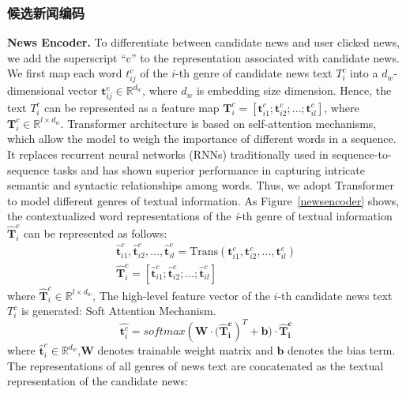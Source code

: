 \documentclass[withoutpreface,bwprint]{cumcmthesis} %
\begin{document}
	\subsubsection{ 候选新闻编码}
	\textbf{News Encoder.} 
	To differentiate between candidate news and user clicked news, we add the superscript “c” to the representation associated with candidate news.
	We first map each word $t^c_{ij}$ of the $i$-th genre of candidate news text $T_i^c$ into a $d_w$-dimensional vector $\mathbf{t}_{ij}^c \in \mathbb{R}^{d_w}$, where $d_w$ is embedding size dimension. Hence, the text $T_i^c$ can be represented as a feature map $\mathbf{T}_i^c = [\mathbf{t}_{i1}^c; \mathbf{t}_{i2}^c; \dots; \mathbf{t}_{il}^c]$, where $\mathbf{T}_i^c \in \mathbb{R}^{l \times d_w}$. 
	Transformer architecture is based on self-attention mechanisms, which allow the model to weigh the importance of different words in a sequence. It replaces recurrent neural networks (RNNs) traditionally used in sequence-to-sequence tasks and has shown superior performance in capturing intricate semantic and syntactic relationships among words. Thus, we adopt Transformer to model different genres of textual information. As Figure~\ref{newsencoder} shows, the contextualized word representations of the \textit{i}-th genre of textual information $\hat{\mathbf{T}}_i^c$ can be represented as follows:
	\begin{equation}\label{eta}
	\begin{split}
	\hat{\mathbf{t}} _{i1}^{c}, \hat{\mathbf{t}}_{i2}^{c}, \ldots, \hat{\mathbf{t}}_{il}^{c} =\mathrm{Trans} (\mathbf{t}^c_{i1},\mathbf{t}^c_{i2}, \ldots, \mathbf{t}^c_{il})\\
	\hat{\mathbf{T}}_i^c = [\hat{\mathbf{t}}_{i1}^{c}; \hat{\mathbf{t}}_{i2}^{c}; \ldots; \hat{\mathbf{t}}_{il}^{c}]
	\end{split}
	\end{equation}\label{eta}
	where $\hat{\mathbf{T}}^{c}_i \in \mathbb{R}^{l \times d_w}$, 
	The high-level feature vector of the $i$-th candidate news text $T_i^c$ is generated: 
	Soft Attention Mechanism.
	\begin{equation}
	\hat{\mathbf{t}^c_i} = softmax( \mathbf{W} \cdot \mathbf{(\hat{\mathbf{T}}^c_i})^{T} + \mathbf{b}) \cdot \mathbf{\hat{\mathbf{T}}^c_i}
	\end{equation}
	where $\hat{\mathbf{t}}^c_i \in \mathbb{R}^{d_w}$,$\mathbf{W}$ denotes trainable weight matrix and $\mathbf{b}$ denotes the bias term.
	The representations of all genres of news text are concatenated as the textual representation of the candidate news:
\end{document}
